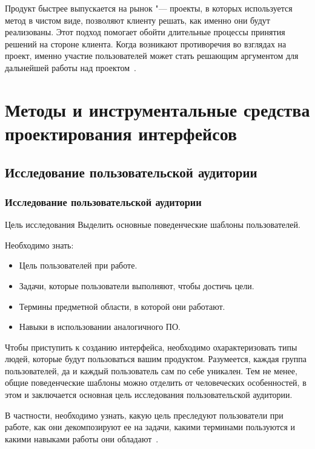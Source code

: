 \documentclass{../industrial-development}
\begin{document}
Продукт быстрее выпускается на рынок "--- проекты, в которых используется метод в чистом виде, позволяют клиенту решать, как именно они будут реализованы. Этот подход помогает обойти длительные процессы принятия решений на стороне клиента. Когда возникают противоречия во взглядах на проект, именно участие пользователей может стать решающим аргументом для дальнейшей работы над проектом~\cite[с.~62--65]{Allen}.

\section{Методы и инструментальные средства проектирования интерфейсов}

\subsection{Исследование пользовательской аудитории}

\begin{frame} \frametitle{Исследование пользовательской аудитории}
  \begin{block}{Цель исследования}
   Выделить основные поведенческие шаблоны пользователей.
  \end{block}
  
  Необходимо знать:
  \begin{itemize}
   \item Цель пользователей при работе.
   \item Задачи, которые пользователи выполняют, чтобы достичь цели.
   \item Термины предметной области, в которой они работают.
   \item Навыки в использовании аналогичного ПО.
  \end{itemize}
\end{frame}

\lecturenotes

Чтобы приступить к созданию интерфейса, необходимо охарактеризовать типы людей, которые будут пользоваться вашим продуктом. Разумеется, каждая группа пользователей, да и каждый пользователь сам по себе уникален. Тем не менее, общие поведенческие шаблоны можно отделить от человеческих особенностей, в этом и заключается основная цель исследования пользовательской аудитории.

В частности, необходимо узнать, какую цель преследуют пользователи при работе, как они декомпозируют ее на задачи, какими терминами пользуются и какими навыками работы они обладают~\cite[с.~25--26]{Tidvell}.
\end{document}

